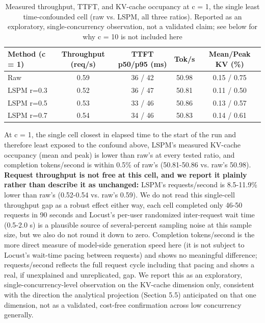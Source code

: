 \begin{table}[htbp]
\caption{Measured throughput, TTFT, and KV-cache occupancy at c = 1, the single least time-confounded cell (raw vs. LSPM, all three ratios). Reported as an exploratory, single-concurrency observation, not a validated claim; see below for why c = 10 is not included here}
\label{tab:9}
\centering
\scriptsize
\setlength{\tabcolsep}{2pt}
\begin{tabular}{lcccc}
\toprule
Method (c = 1) & Throughput (req/s) & TTFT p50/p95 (ms) & Tok/s & Mean/Peak KV (\%) \\
\midrule
Raw & 0.59 & 36 / 42 & 50.98 & 0.15 / 0.75 \\
LSPM r=0.3 & 0.52 & 36 / 47 & 50.81 & 0.11 / 0.50 \\
LSPM r=0.5 & 0.53 & 33 / 46 & 50.86 & 0.13 / 0.57 \\
LSPM r=0.7 & 0.54 & 34 / 46 & 50.83 & 0.14 / 0.61 \\
\bottomrule
\end{tabular}
\end{table}
At c = 1, the single cell closest in elapsed time to the start of the run and therefore least exposed to the confound above, LSPM's measured KV-cache occupancy (mean and peak) is lower than raw's at every tested ratio, and completion tokens/second is within 0.5\% of raw's (50.81-50.86 vs. raw's 50.98). \textbf{Request throughput is not free at this cell, and we report it plainly rather than describe it as unchanged:} LSPM's requests/second is 8.5-11.9\% lower than raw's (0.52-0.54 vs. raw's 0.59). We do not read this single-cell throughput gap as a robust effect either way, each cell completed only 46-50 requests in 90 seconds and Locust's per-user randomized inter-request wait time (0.5-2.0 s) is a plausible source of several-percent sampling noise at this sample size, but we also do not round it down to zero. Completion tokens/second is the more direct measure of model-side generation speed here (it is not subject to Locust's wait-time pacing between requests) and shows no meaningful difference; requests/second reflects the full request cycle including that pacing and shows a real, if unexplained and unreplicated, gap. We report this as an exploratory, single-concurrency-level observation on the KV-cache dimension only, consistent with the direction the analytical projection (Section 5.5) anticipated on that one dimension, not as a validated, cost-free confirmation across low concurrency generally.


